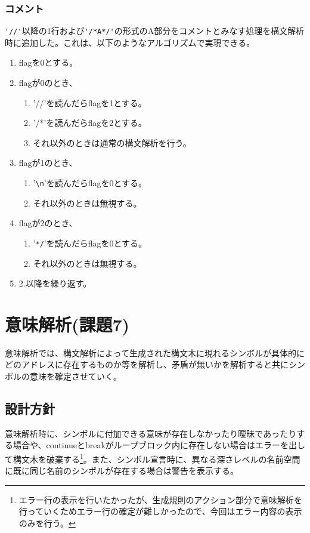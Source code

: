 \documentclass[titlepage, a4paper,12pt]{jarticle}
\begin{document}
\subsubsection{コメント}
\verb|'//'|以降の1行および\verb|'/*A*/'|の形式のA部分をコメントとみなす処理を構文解析時に追加した。これは、以下のようなアルゴリズムで実現できる。
\begin{enumerate}
\item flagを0とする。
\item flagが0のとき、
  \begin{enumerate}
  \item '//'を読んだらflagを1とする。
  \item '/*'を読んだらflagを2とする。
  \item それ以外のときは通常の構文解析を行う。
  \end{enumerate}
\item flagが1のとき、
  \begin{enumerate}
  \item '\verb|\n|'を読んだらflagを0とする。
  \item それ以外のときは無視する。
  \end{enumerate}
\item flagが2のとき、
  \begin{enumerate}
  \item '\verb|*/|'を読んだらflagを0とする。
  \item それ以外のときは無視する。
  \end{enumerate}
\item 2.以降を繰り返す。
\end{enumerate}
\section{意味解析(課題7)}
\label{sec:meaning}
意味解析では、構文解析によって生成された構文木に現れるシンボルが具体的にどのアドレスに存在するものか等を解析し、矛盾が無いかを解析すると共にシンボルの意味を確定させていく。
\subsection{設計方針}
意味解析時に、シンボルに付加できる意味が存在しなかったり曖昧であったりする場合や、continueとbreakがループブロック内に存在しない場合はエラーを出して構文木を破棄する\footnote{エラー行の表示を行いたかったが、生成規則のアクション部分で意味解析を行っていくためエラー行の確定が難しかったので、今回はエラー内容の表示のみを行う。}。また、シンボル宣言時に、異なる深さレベルの名前空間に既に同じ名前のシンボルが存在する場合は警告を表示する。
\end{document}
